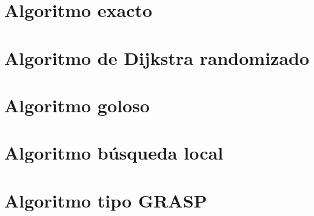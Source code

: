 \section{Algoritmo exacto}
\label{exacto-codigo}


\newpage

\section{Algoritmo de Dijkstra randomizado}
\label{dijkstra-codigo}



\newpage

\section{Algoritmo goloso}
\label{goloso-codigo}


\newpage

\section{Algoritmo búsqueda local}
\label{busqueda-local-codigo}


\newpage

\section{Algoritmo tipo GRASP}
\label{grasp-codigo}

